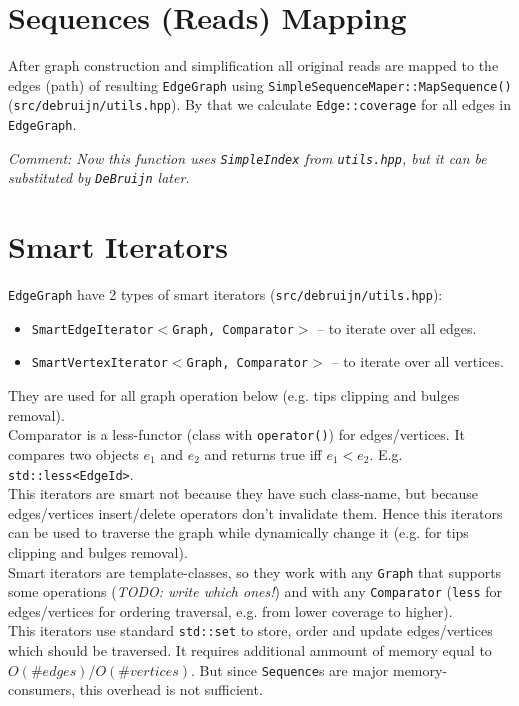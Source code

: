 \documentclass[14pt]{article}
\begin{document}
\section{Sequences (Reads) Mapping}

After graph construction and simplification all original reads are mapped to the edges (path) of resulting \texttt{EdgeGraph} using \texttt{SimpleSequenceMaper::MapSequence()} (\texttt{src/debruijn/utils.hpp}). By that we calculate \texttt{Edge::coverage} for all edges in \texttt{EdgeGraph}.

\textit{Comment: Now this function uses \texttt{SimpleIndex} from \texttt{utils.hpp}, but it can be substituted by \texttt{DeBruijn} later.} 

\section{Smart Iterators}

\texttt{EdgeGraph} have 2 types of smart iterators (\texttt{src/debruijn/utils.hpp}):
\begin{itemize}
\item \texttt{SmartEdgeIterator$<$Graph, Comparator$>$} -- to iterate over all edges.
\item \texttt{SmartVertexIterator$<$Graph, Comparator$>$} -- to iterate over all vertices.
\end{itemize}
They are used for all graph operation below (e.g. tips clipping and bulges removal). \\

Comparator is a less-functor (class with \texttt{operator()}) for edges/vertices. It compares two objects $e_1$ and $e_2$ and returns true iff $e_1 < e_2$. E.g. \texttt{std::less<EdgeId>}. \\

This iterators are smart not because they have such class-name, but because edges/vertices insert/delete operators don't invalidate them. Hence this iterators can be used to traverse the graph while dynamically change it (e.g. for tips clipping and bulges removal). \\

Smart iterators are template-classes, so they work with any \texttt{Graph} that supports some operations (\textit{TODO: write which ones!}) and with any \texttt{Comparator} (\texttt{less} for edges/vertices for ordering traversal, e.g. from lower coverage to higher). \\

This iterators use standard \texttt{std::set} to store, order and update edges/vertices which should be traversed. It requires additional ammount of memory equal to $O(\#edges)$/$O(\#vertices)$. But since \texttt{Sequence}s are major memory-consumers, this overhead is not sufficient.
\end{document}
